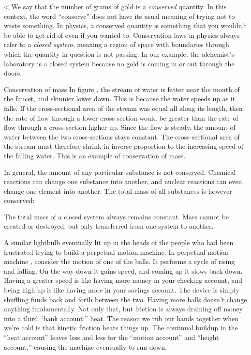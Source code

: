 <%
We say that the number of grams of gold is a \emph{conserved}
quantity. In this context, the word ``conserve'' does not
have its usual meaning of trying not to waste something. In
physics, a conserved quantity is something that you wouldn't
be able to get rid of even if you wanted to. Conservation
laws in physics always refer to a \emph{closed system},
meaning a region of space with boundaries through which the
quantity in question is not passing. In our example, the
alchemist's laboratory is a closed system because no gold is
coming in or out through the doors.

\begin{eg}{Conservation of mass}\label{eg:faucet}
In figure ,
the stream
of water is fatter near the mouth of the faucet, and skinnier lower down. This is because the
water speeds up as it falls. If the cross-sectional area of the stream was equal all along
its length, then the rate of flow through a lower cross-section
would be greater than the rate of flow through a cross-section higher up. Since the flow
is steady, the amount of water between the two cross-sections stays constant.
The cross-sectional area of the stream must therefore shrink in inverse
proportion to the increasing speed of the falling water. This is an example of
conservation of mass. 
\end{eg}

In general, the amount of any particular substance is not conserved. Chemical
reactions can change one substance into another, and nuclear reactions can even
change one element into another. The total mass of all substances is however
conserved:

\begin{important}
The total mass of a closed system always remains constant. Mass cannot
be created or destroyed, but only transferred from one system to another.
\end{important}

A similar lightbulb eventually lit up in the heads of the
people who had been frustrated trying to build a perpetual
motion machine. In perpetual motion machine
,
consider the motion of one of the balls.
It performs a cycle of rising and falling. On the way down
it gains speed, and coming up it slows back down. Having a
greater speed is like having more money in your checking
account, and being high up is like having more in your
savings account. The device is simply shuffling funds back
and forth between the two. Having more balls doesn't change
anything fundamentally. Not only that, but friction is
always draining off money into a third ``bank account:''
heat. The reason we rub our hands together when we're cold
is that kinetic friction heats things up. The continual
buildup in the ``heat account'' leaves less and less for the
``motion account'' and ``height account,'' causing the
machine eventually to run down.


